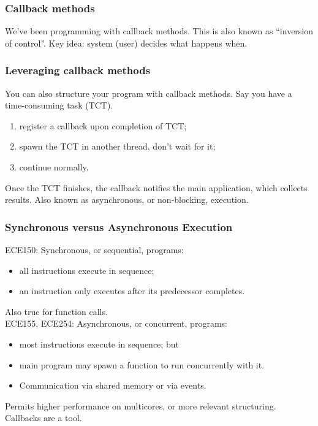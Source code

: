 \begin{frame}
\frametitle{Callback methods}

\begin{changemargin}{1cm}
We've been programming with \alert{callback methods}.\vfill
This is also known as ``inversion of control''.\vfill
Key idea: system (user) decides what happens when.
\end{changemargin}

\end{frame}

\begin{frame}
\frametitle{Leveraging callback methods}

\begin{changemargin}{1cm}
You can also structure your program with callback methods.
Say you have a time-consuming task (TCT).\vfill
\begin{enumerate}
\item register a callback upon completion of TCT;
\item spawn the TCT in another thread, don't wait for it;
\item continue normally.
\end{enumerate}\vfill
Once the TCT finishes, the callback notifies the main application,
which collects results.\vfill
Also known as asynchronous, or non-blocking, execution.
\end{changemargin}

\end{frame}

\begin{frame}
\frametitle{Synchronous versus Asynchronous Execution}

\begin{changemargin}{1cm}
ECE150: Synchronous, or sequential, programs:
\begin{itemize}
\item all instructions execute in sequence;
\item an instruction only executes after its predecessor completes.
\end{itemize}
Also true for function calls.\\[1em]

ECE155, ECE254: Asynchronous, or concurrent, programs:
\begin{itemize}
\item most instructions execute in sequence; but
\item main program may spawn a function to run concurrently with it.
\item Communication via shared memory or via events.
\end{itemize}
Permits higher performance on multicores, or more relevant structuring.
Callbacks are a tool.
\end{changemargin}

\end{frame}

